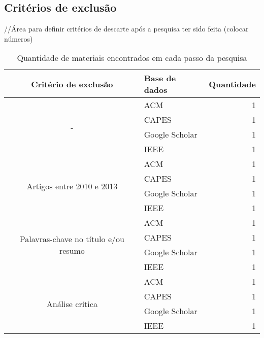 		\subsection{Critérios de exclusão}
			//Área para definir critérios de descarte após a pesquisa ter sido feita (colocar números)
			\begin{table}[H]
				\centering
				\begin{tabular}{| c | l | r |} \hline \textbf{Critério de exclusão} & \textbf{Base de dados}  & \textbf{Quantidade} \\ \hline
					\multirow{4}{*}{-}
						& ACM & 1 \\ \cline{2-3}
						& CAPES & 1 \\ \cline{2-3}
						& Google Scholar & 1 \\ \cline{2-3}
						& IEEE & 1 \\ \cline{2-3}
					\hline \hline
					\multirow{4}{*}{Artigos entre 2010 e 2013} 
						& ACM & 1 \\ \cline{2-3}
						& CAPES & 1 \\ \cline{2-3}
						& Google Scholar & 1 \\ \cline{2-3}
						& IEEE & 1 \\ \cline{2-3}
					\hline \hline
					\multirow{4}{*}{Palavras-chave no título e/ou resumo} 
						& ACM & 1 \\ \cline{2-3}
						& CAPES & 1 \\ \cline{2-3}
						& Google Scholar & 1 \\ \cline{2-3}
						& IEEE & 1 \\ \cline{2-3}
					\hline \hline
					\multirow{4}{*}{Análise crítica}
						& ACM & 1 \\ \cline{2-3}
						& CAPES & 1 \\ \cline{2-3}
						& Google Scholar & 1 \\ \cline{2-3}
						& IEEE & 1 \\ \cline{2-3}
					\hline
				\end{tabular}
				\caption{Quantidade de materiais encontrados em cada passo da pesquisa}
				\label{tab:quantidadeDeMateriais}
			\end{table}
